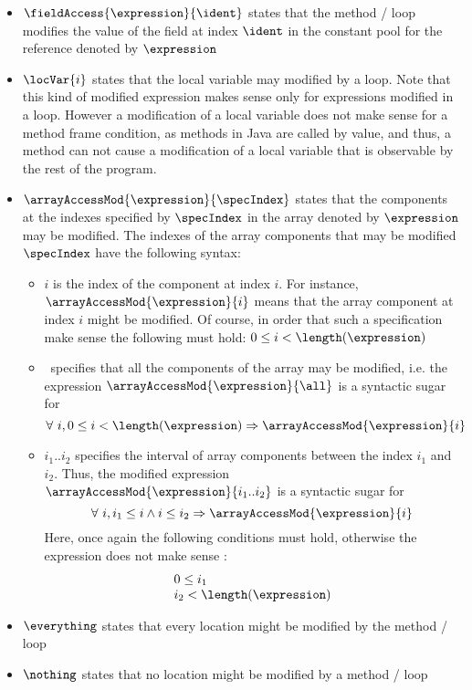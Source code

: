 \begin{itemize}
      \item  $ \fieldAccess{\expression}{\ident} $ states that the method / loop modifies the value of the field at index $\ident$ 
             in the constant pool for the reference denoted by  $\expression$ 
      \item $\locVar{i}$ states that the local variable may modified by a loop. Note that this kind of modified
            expression makes sense only for expressions modified in a loop.
	    However a modification of a local variable does not make sense for a method frame condition, as methods in Java are called by value, and
	    thus, a method can not cause a modification of a local variable that is observable by the rest of the program.
	    
      \item  $\arrayAccessMod{\expression}{\specIndex}$ states that the components at the indexes specified by $\specIndex$ in
            the array denoted by $\expression$ may be modified. The indexes of the array components that may be modified $\specIndex$
	    have the following syntax:
	    \begin{itemize}
	          \item $i$ is the index of the component at index $i$. For instance, \\
		        $\arrayAccessMod{\expression}{i}$ means that the array component at index $i$ might be modified. Of course, in order that
			such a specification make sense the following must hold:
			$ 0  \le i < \length(\expression )   $
	          \item \all \ specifies that all the components of the array may be modified, i.e. the expression 
		         $\arrayAccessMod{\expression}{\all}$ is a syntactic sugar for 
                       $$ \forall \ i ,   0  \le i < \length(\expression ) \Rightarrow \arrayAccessMod{\expression}{i }$$
		       
		  \item $ i_1 .. i_2$ specifies the interval of array components between the index $i_1$  and $i_2$.  
		        Thus, the modified expression  $\arrayAccessMod{\expression}{i_1 .. i_2}$ is a syntactic sugar for 
			  $$ \forall \ i ,  i_1 \leq i \wedge  i \leq i_2 \Rightarrow \arrayAccessMod{\expression}{i }$$
			  Here, once again the following conditions must hold, otherwise the expression does not
			  make sense :
			  $$ \begin{array}{l}
			           0  \le i_1 \\
				   i_2  < \length(\expression )
			     \end{array}
			  $$
	    \end{itemize}

      \item $\everything $ states that every location might be modified by the method / loop
      \item $\nothing$ states that no location might be modified by a method / loop
\end{itemize}
